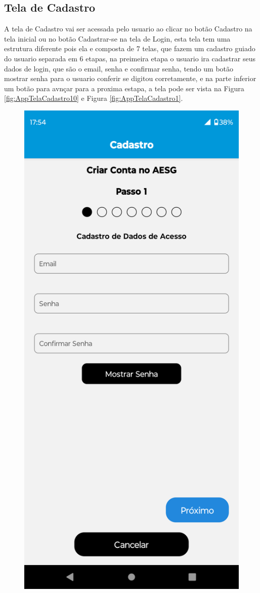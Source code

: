 \documentclass[
    12pt,                   %
    openright,              %
    oneside,                %
    a4paper,                %
    sumario=tradicional,    %
    english,                %
    brazil,                 %
    ]{abntex2}
\begin{document}
        \subsection{Tela de Cadastro}
            A tela de Cadastro vai ser acessada pelo usuario ao clicar no botão Cadastro na tela inicial ou no botão Cadastrar-se na tela de Login, esta tela tem uma estrutura diferente pois ela e composta de 7 telas, que fazem um cadastro guiado do usuario separada em 6 etapas, na preimeira etapa o usuario ira cadastrar seus dados de login, que são o email, senha e confirmar senha, tendo um botão mostrar senha para o usuario conferir se digitou corretamente, e na parte inferior um botão para avnçar para a proxima estapa, a tela pode ser vista na Figura \ref{fig:AppTelaCadastro10} e Figura \ref{fig:AppTelaCadastro1}.
            \begin{figure}[!h]          
                \begin{minipage}{0.5\textwidth}
                    \centering
                    \includegraphics[width=0.8\linewidth]{Imagens/App Images User/AUCadastro10.png}

\end{minipage}
\end{figure}
\end{document}
